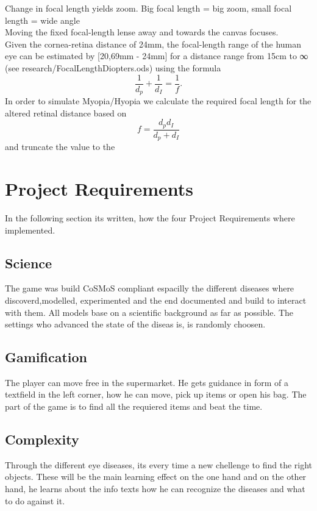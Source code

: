 \documentclass{acm_proc_article-sp}
\begin{document}
Change in focal length yields zoom. Big focal length = big zoom, small focal length = wide angle\\
Moving the fixed focal-length lense away and towards the canvas focuses. \\
Given the cornea-retina distance of 24mm, the focal-length range of the human eye can be estimated by [20,69mm - 24mm] for a distance range from 15cm to ∞ (see research/FocalLengthDiopters.ods) using the formula
\begin{equation}
    \frac{1}{d_p} + \frac{1}{d_I} = \frac{1}{f}.
\end{equation}
In order to simulate Myopia/Hyopia we calculate the required focal length for the altered retinal distance based on
\begin{equation}
    f = \frac{d_p d_I}{d_p + d_I}
\end{equation}
and truncate the value to the 

\section{Project Requirements}
In the following section its written, how the four Project Requirements where implemented.
\subsection{Science}
The game was build CoSMoS compliant espacilly the different diseases where discoverd,modelled, experimented and the end documented and build to interact with them. All models base on a scientific background as far as possible. The settings who advanced the state of the diseas is, is randomly choosen.

\subsection{Gamification}
The player can move free in the supermarket. He gets guidance in form of a textfield in the left corner, how he can move, pick up items or open his bag. The part of the game is to find all the requiered items and beat the time.

\subsection{Complexity}
Through the different eye diseases, its every time a new chellenge to find the right objects. These will be the main learning effect on the one hand and on the other hand, he learns about the info texts how he can recognize the diseases and what to do against it.
\end{document}
